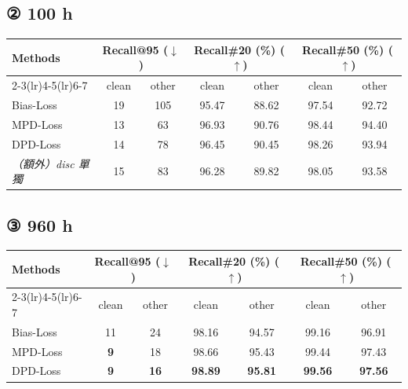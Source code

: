\documentclass[11pt,a4paper]{article}
\begin{document}
\subsection*{② 100 h}

\begin{center}
\begin{tabular}{lcccccc}
\toprule
\multirow{2}{*}{\textbf{Methods}} & \multicolumn{2}{c}{\textbf{Recall@95} ($\downarrow$)} & \multicolumn{2}{c}{\textbf{Recall\#20} (\%) ($\uparrow$)} & \multicolumn{2}{c}{\textbf{Recall\#50} (\%) ($\uparrow$)} \\
\cmidrule(lr){2-3}\cmidrule(lr){4-5}\cmidrule(lr){6-7}
 & clean & other & clean & other & clean & other \\
\midrule
Bias-Loss & 19 & 105 & 95.47 & 88.62 & 97.54 & 92.72 \\
MPD-Loss  & 13 & 63 & 96.93 & 90.76 & 98.44 & 94.40 \\
DPD-Loss  & 14 & 78 & 96.45 & 90.45 & 98.26 & 93.94 \\
\midrule
\textit{（額外）disc 單獨} & 15 & 83 & 96.28 & 89.82 & 98.05 & 93.58 \\
\bottomrule
\end{tabular}
\end{center}

\subsection*{③ 960 h}

\begin{center}
\begin{tabular}{lcccccc}
\toprule
\multirow{2}{*}{\textbf{Methods}} & \multicolumn{2}{c}{\textbf{Recall@95} ($\downarrow$)} & \multicolumn{2}{c}{\textbf{Recall\#20} (\%) ($\uparrow$)} & \multicolumn{2}{c}{\textbf{Recall\#50} (\%) ($\uparrow$)} \\
\cmidrule(lr){2-3}\cmidrule(lr){4-5}\cmidrule(lr){6-7}
 & clean & other & clean & other & clean & other \\
\midrule
Bias-Loss & 11 & 24 & 98.16 & 94.57 & 99.16 & 96.91 \\
MPD-Loss  & \textbf{9} & 18 & 98.66 & 95.43 & 99.44 & 97.43 \\
DPD-Loss  & \textbf{9} & \textbf{16} & \textbf{98.89} & \textbf{95.81} & \textbf{99.56} & \textbf{97.56} \\
\bottomrule
\end{tabular}
\end{center}

\end{document}

